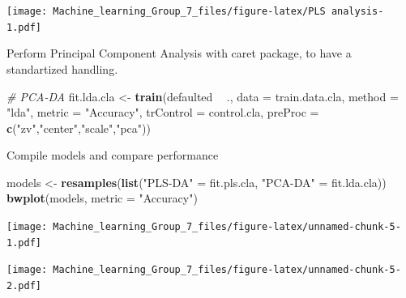 \documentclass[]{article}
\newenvironment{Shaded}{\begin{snugshade}}{\end{snugshade}}
\newcommand{\CommentTok}[1]{\textcolor[rgb]{0.56,0.35,0.01}{\textit{#1}}}
\newcommand{\DataTypeTok}[1]{\textcolor[rgb]{0.13,0.29,0.53}{#1}}
\newcommand{\KeywordTok}[1]{\textcolor[rgb]{0.13,0.29,0.53}{\textbf{#1}}}
\newcommand{\NormalTok}[1]{#1}
\newcommand{\OperatorTok}[1]{\textcolor[rgb]{0.81,0.36,0.00}{\textbf{#1}}}
\newcommand{\StringTok}[1]{\textcolor[rgb]{0.31,0.60,0.02}{#1}}
\begin{document}
\texttt{[image: Machine\_learning\_Group\_7\_files/figure-latex/PLS analysis-1.pdf]}

Perform Principal Component Analysis with caret package, to have a
standartized handling.

\begin{Shaded}
\begin{Highlighting}[]
\CommentTok{# PCA-DA}
\NormalTok{fit.lda.cla <-}\StringTok{ }\KeywordTok{train}\NormalTok{(defaulted }\OperatorTok{~}\StringTok{ }\NormalTok{., }\DataTypeTok{data =}\NormalTok{ train.data.cla,}
\DataTypeTok{method =} \StringTok{"lda"}\NormalTok{,}
\DataTypeTok{metric =} \StringTok{"Accuracy"}\NormalTok{,}
\DataTypeTok{trControl =}\NormalTok{ control.cla,}
\DataTypeTok{preProc =} \KeywordTok{c}\NormalTok{(}\StringTok{"zv"}\NormalTok{,}\StringTok{"center"}\NormalTok{,}\StringTok{"scale"}\NormalTok{,}\StringTok{"pca"}\NormalTok{))}
\end{Highlighting}
\end{Shaded}

Compile models and compare performance

\begin{Shaded}
\begin{Highlighting}[]
\NormalTok{models <-}\StringTok{ }\KeywordTok{resamples}\NormalTok{(}\KeywordTok{list}\NormalTok{(}\StringTok{"PLS-DA"}\NormalTok{ =}\StringTok{ }\NormalTok{fit.pls.cla, }\StringTok{"PCA-DA"}\NormalTok{ =}\StringTok{ }\NormalTok{fit.lda.cla))}
\KeywordTok{bwplot}\NormalTok{(models, }\DataTypeTok{metric =} \StringTok{"Accuracy"}\NormalTok{)}
\end{Highlighting}
\end{Shaded}

\texttt{[image: Machine\_learning\_Group\_7\_files/figure-latex/unnamed-chunk-5-1.pdf]}

\begin{Shaded}
\end{Shaded}

\texttt{[image: Machine\_learning\_Group\_7\_files/figure-latex/unnamed-chunk-5-2.pdf]}
\end{document}
